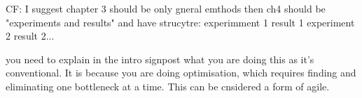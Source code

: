 

CF: I suggest chapter 3 should be only gneral emthods
then ch4 should be "experiments and results"
    and have strucytre:
        experimment 1
        result 1
        experiment 2 
        result 2...

you need to explain in the intro signpost what you are doing this as it's conventional. It is because you are doing optimisation, which requires finding and eliminating one bottleneck at a time. This can be cnsidered a form of agile.




